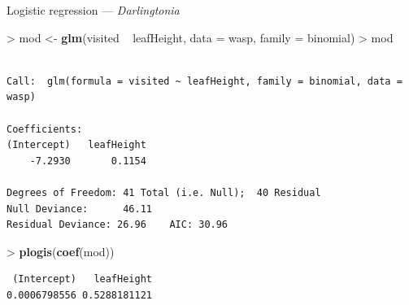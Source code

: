\documentclass[10pt,ignorenonframetext,compress, aspectratio=169]{beamer}
\newenvironment{Shaded}{\begin{snugshade}}{\end{snugshade}}
\newcommand{\KeywordTok}[1]{\textcolor[rgb]{0.13,0.29,0.53}{\textbf{{#1}}}}
\newcommand{\DataTypeTok}[1]{\textcolor[rgb]{0.13,0.29,0.53}{{#1}}}
\newcommand{\StringTok}[1]{\textcolor[rgb]{0.31,0.60,0.02}{{#1}}}
\newcommand{\NormalTok}[1]{{#1}}
\begin{document}
\begin{frame}[fragile]{Logistic regression --- \emph{Darlingtonia}}

\begin{Shaded}
\begin{Highlighting}[]
\NormalTok{>}\StringTok{ }\NormalTok{mod <-}\StringTok{ }\KeywordTok{glm}\NormalTok{(visited ~}\StringTok{ }\NormalTok{leafHeight, }\DataTypeTok{data =} \NormalTok{wasp, }\DataTypeTok{family =} \NormalTok{binomial)}
\NormalTok{>}\StringTok{ }\NormalTok{mod}
\end{Highlighting}
\end{Shaded}

\begin{verbatim}

Call:  glm(formula = visited ~ leafHeight, family = binomial, data = wasp)

Coefficients:
(Intercept)   leafHeight  
    -7.2930       0.1154  

Degrees of Freedom: 41 Total (i.e. Null);  40 Residual
Null Deviance:      46.11 
Residual Deviance: 26.96    AIC: 30.96
\end{verbatim}

\begin{Shaded}
\begin{Highlighting}[]
\NormalTok{>}\StringTok{ }\KeywordTok{plogis}\NormalTok{(}\KeywordTok{coef}\NormalTok{(mod))}
\end{Highlighting}
\end{Shaded}

\begin{verbatim}
 (Intercept)   leafHeight 
0.0006798556 0.5288181121 
\end{verbatim}

\end{frame}
\end{document}
